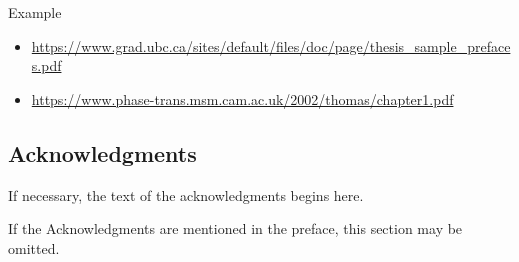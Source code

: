 \documentclass[11pt]{report}
\numberwithin{figure}{section}
\theoremstyle{plain}
\theoremstyle{definition}
\theoremstyle{corollary}
\theoremstyle{definition}
\theoremstyle{plain}
\theoremstyle{definition}
\theoremstyle{plain}
\begin{document}
\bigskip
Example
\begin{itemize}
\item\url{https://www.grad.ubc.ca/sites/default/files/doc/page/thesis_sample_prefaces.pdf}
\item\url{https://www.phase-trans.msm.cam.ac.uk/2002/thomas/chapter1.pdf}
\end{itemize}

\newpage
\begin{center}
\section*{Acknowledgments}
\end{center}

\normalsize
If necessary, the text of the acknowledgments begins here. \par
If the Acknowledgments are mentioned in the preface, this section may be omitted. \par

\newpage
\renewcommand*\contentsname{Table of Contents}
\tableofcontents


\listoftables
{}


\listoffigures
{}

\end{document}
